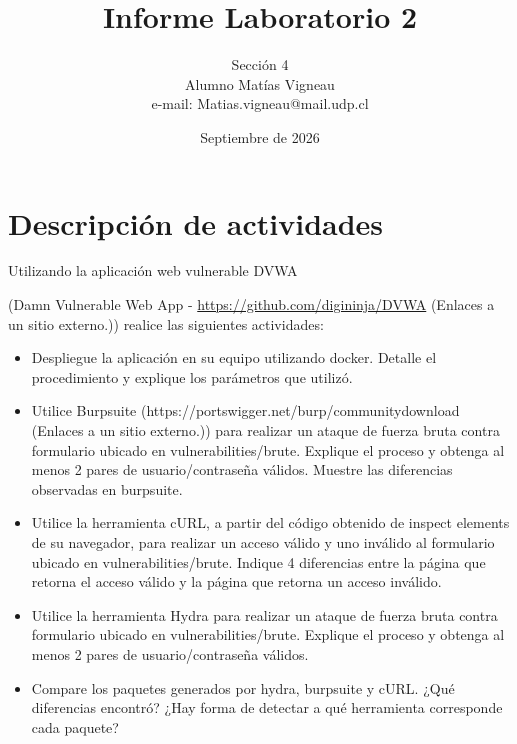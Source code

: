 \documentclass[letter,12pt]{article}
\begin{document}
%
   \title{\Huge{Informe Laboratorio 2}}

   \author{Sección 4 \\ Alumno Matías Vigneau \\ e-mail: Matias.vigneau@mail.udp.cl}

   \date{Septiembre de 2026}

   \maketitle

   \tableofcontents

  \newpage


\section{Descripción de actividades}
Utilizando la aplicación web vulnerable DVWA

(Damn Vulnerable Web App - \href{https://github.com/digininja/DVWA}{https://github.com/digininja/DVWA} (Enlaces a un sitio externo.)) realice las siguientes actividades:


\begin{itemize}
    \item Despliegue la aplicación en su equipo utilizando docker. Detalle el procedimiento y explique los parámetros que utilizó.
    \item Utilice Burpsuite (https://portswigger.net/burp/communitydownload (Enlaces a un sitio externo.)) para realizar un ataque de fuerza bruta contra formulario ubicado en vulnerabilities/brute. Explique el proceso y obtenga al menos 2 pares de usuario/contraseña válidos. Muestre las diferencias observadas en burpsuite.
    \item Utilice la herramienta cURL, a partir del código obtenido de inspect elements de su navegador, para realizar un acceso válido y uno inválido al formulario ubicado en vulnerabilities/brute. Indique 4 diferencias entre la página que retorna el acceso válido y la página que retorna un acceso inválido.
    \item Utilice la herramienta Hydra para realizar un ataque de fuerza bruta contra formulario ubicado en vulnerabilities/brute. Explique el proceso y obtenga al menos 2 pares de usuario/contraseña válidos.
    \item Compare los paquetes generados por hydra, burpsuite y cURL. ¿Qué diferencias encontró? ¿Hay forma de detectar a qué herramienta corresponde cada paquete?
\end{itemize}
\end{document}
